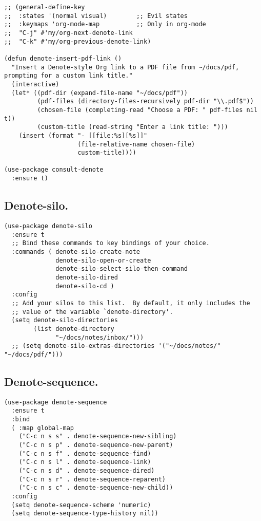 \documentclass[11pt]{article}
\begin{document}
\begin{verbatim}
;; (general-define-key
;;  :states '(normal visual)        ;; Evil states
;;  :keymaps 'org-mode-map          ;; Only in org-mode
;;  "C-j" #'my/org-next-denote-link
;;  "C-k" #'my/org-previous-denote-link)

(defun denote-insert-pdf-link ()
  "Insert a Denote-style Org link to a PDF file from ~/docs/pdf, prompting for a custom link title."
  (interactive)
  (let* ((pdf-dir (expand-file-name "~/docs/pdf"))
         (pdf-files (directory-files-recursively pdf-dir "\\.pdf$"))
         (chosen-file (completing-read "Choose a PDF: " pdf-files nil t))
         (custom-title (read-string "Enter a link title: ")))
    (insert (format "- [[file:%s][%s]]"
                    (file-relative-name chosen-file)
                    custom-title))))

(use-package consult-denote
  :ensure t)
\end{verbatim}
\subsection{Denote-silo.}
\label{sec:org1dc4055}
\begin{verbatim}
(use-package denote-silo
  :ensure t
  ;; Bind these commands to key bindings of your choice.
  :commands ( denote-silo-create-note
              denote-silo-open-or-create
              denote-silo-select-silo-then-command
              denote-silo-dired
              denote-silo-cd )
  :config
  ;; Add your silos to this list.  By default, it only includes the
  ;; value of the variable `denote-directory'.
  (setq denote-silo-directories
        (list denote-directory
              "~/docs/notes/inbox/")))
  ;; (setq denote-silo-extras-directories '("~/docs/notes/" "~/docs/pdf/")))
\end{verbatim}
\subsection{Denote-sequence.}
\label{sec:org0f6bbae}
\begin{verbatim}
(use-package denote-sequence
  :ensure t
  :bind
  ( :map global-map
    ("C-c n s s" . denote-sequence-new-sibling)
    ("C-c n s p" . denote-sequence-new-parent)
    ("C-c n s f" . denote-sequence-find)
    ("C-c n s l" . denote-sequence-link)
    ("C-c n s d" . denote-sequence-dired)
    ("C-c n s r" . denote-sequence-reparent)
    ("C-c n s c" . denote-sequence-new-child))
  :config
  (setq denote-sequence-scheme 'numeric)
  (setq denote-sequence-type-history nil))
\end{verbatim}
\end{document}
